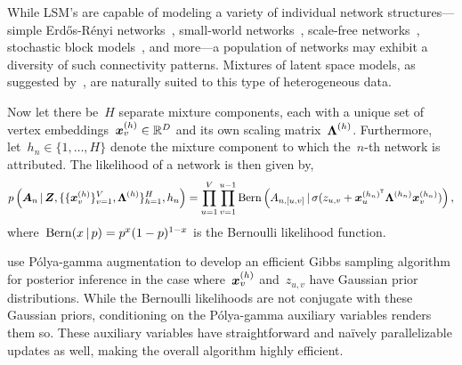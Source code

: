 While LSM's are capable of modeling a variety of individual network
structures---simple Erd\H{o}s-R\'{e}nyi
networks~\citep{erdos1959random}, small-world
networks~\citep{watts1998collective}, scale-free
networks~\citep{barabasi1999emergence}, stochastic block
models~\citep{nowicki2001estimation, airoldi2008mixed}, and more---a
population of networks may exhibit a diversity of such connectivity
patterns.  Mixtures of latent space models, as suggested
by~\citet{durante2016nonparametric}, are naturally suited to this type
of heterogeneous data.

Now let there
be~$H$ separate mixture components, each with 
a unique set of vertex embeddings~${\boldsymbol{x}_v^{(h)} \in \mathbb{R}^D}$
and its own scaling matrix~$\boldsymbol{\Lambda}^{(h)}$. Furthermore,
let~${h_n \in \{1, \ldots, H\}}$ denote the mixture component
to which the~$n$-th network is attributed. 
The likelihood of a network is then
given by,
\begin{align}
  \label{eq:molsm_lkhd}
  p \left(\boldsymbol{A}_n \, | \,
    \boldsymbol{Z}, \{\{\boldsymbol{x}_v^{(h)}\}_{v=1}^V,
  \boldsymbol{\Lambda}^{(h)}\}_{h=1}^H, h_n \right) 
  = \prod_{u=1}^V \prod_{v=1}^{u-1}
  \mathrm{Bern} \left(A_{n,[u,v]} \, | \,
    \sigma(z_{u,v} + \boldsymbol{x}_{u}^{(h_n)^{\mathsf{T}}} \boldsymbol{\Lambda}^{(h_n)} \boldsymbol{x}_v^{(h_n)}) \right),
\end{align}
where~${\mathrm{Bern}(x \, | \, p) = p^x (1-p)^{1-x}}$ is the Bernoulli likelihood function.

\citet{durante2016nonparametric} use
P\'{o}lya-gamma augmentation to develop an
efficient Gibbs sampling algorithm for posterior inference in the case
where~$\boldsymbol{x}_v^{(h)}$ and~$z_{u,v}$ have Gaussian prior distributions. 
While the Bernoulli likelihoods are not conjugate with these Gaussian
priors, conditioning on the P\'{o}lya-gamma auxiliary variables renders them so.
These auxiliary variables have straightforward and na\"{i}vely parallelizable
updates as well, making the overall algorithm highly efficient.

